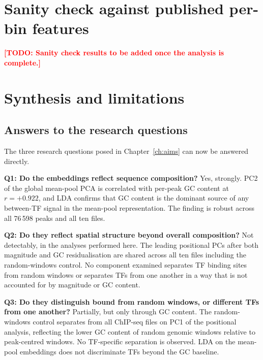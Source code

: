 \documentclass[12pt,a4paper,twoside,final]{book}
\newcommand{\todo}[1]{\textcolor{red}{\textbf{[TODO: #1]}}}
\begin{document}
\section{Sanity check against published per-bin features} %
\label{sec:sanity-results}

\todo{Sanity check results to be added once the analysis is complete.}

\section{Synthesis and limitations}
\label{sec:synthesis}

\subsection{Answers to the research questions}

The three research questions posed in Chapter~\ref{ch:aims} can now be answered directly.

\textbf{Q1: Do the embeddings reflect sequence composition?} %
Yes, strongly.
PC2 of the global mean-pool PCA is correlated with per-peak GC content at $r = +0.922$, and LDA confirms that GC content is the dominant source of any between-TF signal in the mean-pool representation.
The finding is robust across all 76\,598 peaks and all ten files. %

\textbf{Q2: Do they reflect spatial structure beyond overall composition?}
Not detectably, in the analyses performed here.
The leading positional PCs after both magnitude and GC residualisation are shared across all ten files including the random-windows control.
No component examined separates TF binding sites from random windows or separates TFs from one another in a way that is not accounted for by magnitude or GC content. %

\textbf{Q3: Do they distinguish bound from random windows, or different TFs from one another?} %
Partially, but only through GC content.
The random-windows control separates from all ChIP-seq files on PC1 of the positional analysis, reflecting the lower GC content of random genomic windows relative to peak-centred windows. %
No TF-specific separation is observed. %
LDA on the mean-pool embeddings does not discriminate TFs beyond the GC baseline.
\end{document}
